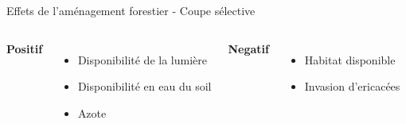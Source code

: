 \documentclass[11pt, compress, aspectratio=1610]{beamer}
\newcommand{\begincols}{\begin{columns}}
\newcommand{\stopcols}{\end{columns}}
\begin{document}

\begin{frame}{Effets de l’aménagement forestier - Coupe sélective}
\protect\hypertarget{effets-de-lamuxe9nagement-forestier---coupe-suxe9lective}{}

\begincols
\hspace*{20mm}

\textbf{Positif}

\begin{itemize}
    \item
      Disponibilité de la lumière
    \item
      Disponibilité en eau du soil
    \item
      Azote
  \end{itemize}
\hfill{}
  \vspace*{-10mm}

\textbf{Negatif}

\begin{itemize}
    \item
      Habitat disponible
    \item
      Invasion d'ericacées
  \end{itemize}
\stopcols

\end{frame}
\end{document}
